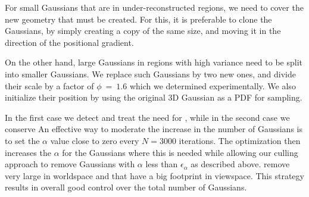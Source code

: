 For small Gaussians that are in under-reconstructed regions, we need to cover the new geometry that must be created. 
For this, it is preferable to clone the Gaussians, by simply creating a copy of the same size, and moving it in the direction of the positional gradient.

On the other hand, large Gaussians in regions with high variance need to be split into smaller Gaussians. We replace such Gaussians by two new ones, and divide their scale by a factor of $\phi~=~1.6$ which we determined experimentally.
We also initialize their position by 
using the original 3D Gaussian as a PDF for sampling.


In the first case we detect and treat the need for , while in the second case we conserve  
An effective way to moderate the increase in the number of Gaussians  is to set the $\alpha$ value close to zero every $N=3000$ iterations. The optimization then increases the $\alpha$ for the Gaussians where this is needed while allowing our culling approach to remove Gaussians with $\alpha$ less than $\epsilon_{\alpha}$ as described above.  remove  very large  in worldspace and  that have a big footprint in viewspace. This strategy results in overall good control over the total number of Gaussians. 






